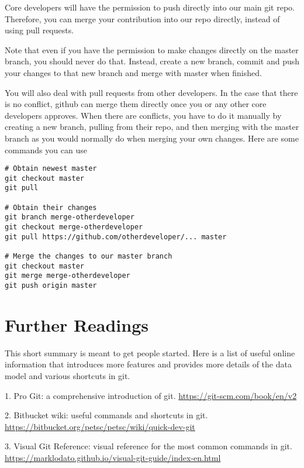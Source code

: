 \documentclass[runningheads,letterpaper]{llncs}
\begin{document}
Core developers will have the permission to push directly into our main git repo.
Therefore, you can merge your contribution into our repo directly, instead of using pull requests.

Note that even if you have the permission to make changes directly on the master branch, you should never do that.
Instead, create a new branch, commit and push your changes to that new branch and merge with master when finished.

You will also deal with pull requests from other developers.
In the case that there is no conflict, github can merge them directly once you or any other core developers approves.
When there are conflicts, you have to do it manually by creating a new branch, pulling from their repo, and then merging with the master branch as you would normally do when merging your own changes.
Here are some commands you can use
\begin{verbatim}
# Obtain newest master
git checkout master
git pull

# Obtain their changes
git branch merge-otherdeveloper
git checkout merge-otherdeveloper
git pull https://github.com/otherdeveloper/... master

# Merge the changes to our master branch
git checkout master
git merge merge-otherdeveloper
git push origin master
\end{verbatim}

\section{Further Readings}

This short summary is meant to get people started.
Here is a list of useful online information that introduces more features and provides more details of the data model and various shortcuts in git.

1. Pro Git: a comprehensive introduction of git. \url{https://git-scm.com/book/en/v2}

2. Bitbucket wiki: useful commands and shortcuts in git. \url{https://bitbucket.org/petsc/petsc/wiki/quick-dev-git}

3. Visual Git Reference: visual reference for the most common commands in git. \url{https://marklodato.github.io/visual-git-guide/index-en.html}
\end{document}
